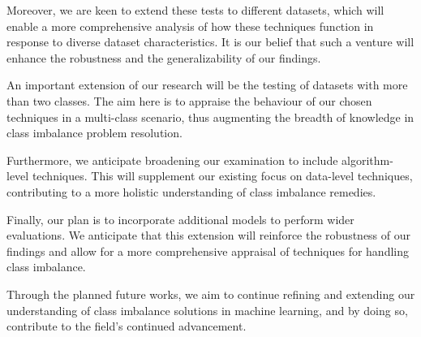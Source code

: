 \documentclass[journal]{IEEEtran}
\begin{document}
	Moreover, we are keen to extend these tests to different datasets, which will enable a more comprehensive analysis of how these techniques function in response to diverse dataset characteristics. It is our belief that such a venture will enhance the robustness and the generalizability of our findings.
	
	An important extension of our research will be the testing of datasets with more than two classes. The aim here is to appraise the behaviour of our chosen techniques in a multi-class scenario, thus augmenting the breadth of knowledge in class imbalance problem resolution.
	
	Furthermore, we anticipate broadening our examination to include algorithm-level techniques. This will supplement our existing focus on data-level techniques, contributing to a more holistic understanding of class imbalance remedies.
	
	Finally, our plan is to incorporate additional models to perform wider evaluations. We anticipate that this extension will reinforce the robustness of our findings and allow for a more comprehensive appraisal of techniques for handling class imbalance.
	
	Through the planned future works, we aim to continue refining and extending our understanding of class imbalance solutions in machine learning, and by doing so, contribute to the field's continued advancement.
	
		
	\label{sec:references}
	
	
	
\end{document}
